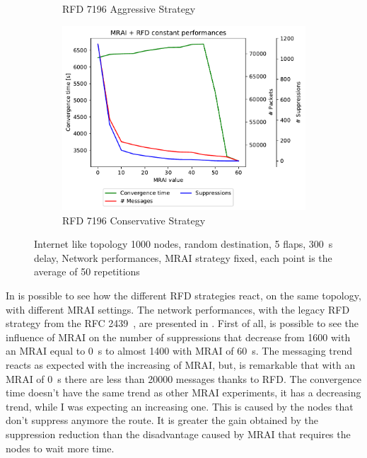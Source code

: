 \begin{figure}[h]
\begin{subfigure}[b]{0.49\textwidth}
         \caption{RFD 7196 Aggressive Strategy}
         \label{fig:1000_7196RFDA_multiMRAI_mice}
     \end{subfigure}
     \begin{subfigure}[b]{0.49\textwidth}
         \centering
         \includegraphics[width=\textwidth]{images/RFD/miceVSelephants/MultiMRAI/mice/cisco_1000_RFD_7196_conservative-constant_mrai_rfd_evolution.pdf}
         \caption{RFD 7196 Conservative Strategy}
         \label{fig:1000_7196RFDC_multiMRAI_mice}
     \end{subfigure}
		\caption{Internet like topology \num{1000} nodes, random destination,
		\num{5} flaps, \SI{300}{\second} delay, Network performances, \ac{MRAI}
		strategy fixed, each point is the average of
		\num{50} repetitions}
        \label{fig:1000_RFD_multiMRAI_mice}
\end{figure}

In  is possible to see how the different \ac{RFD} strategies
react, on the same topology, with different \ac{MRAI} settings.
The network performances, with the legacy \ac{RFD} strategy from the \ac{RFC}
\num{2439}~\cite{rfc2439}, are presented in .
First of all, is possible to see the influence of \ac{MRAI} on the number of suppressions
that decrease from \num{1600} with an \ac{MRAI} equal to \SI{0}{\second} to almost
\num{1400} with \ac{MRAI} of \SI{60}{\second}.
The messaging trend reacts as expected with the increasing of
\ac{MRAI}, but, is remarkable that with an \ac{MRAI} of \SI{0}{\second} there
are less than \num{20000} messages thanks to \ac{RFD}.
The convergence time doesn't have the same trend as other \ac{MRAI} experiments,
it has a decreasing trend, while I was expecting an increasing one.
This is caused by the nodes that don't suppress anymore the route.
It is greater the gain obtained by the suppression reduction than the disadvantage
caused by \ac{MRAI} that requires the nodes to wait more time.

